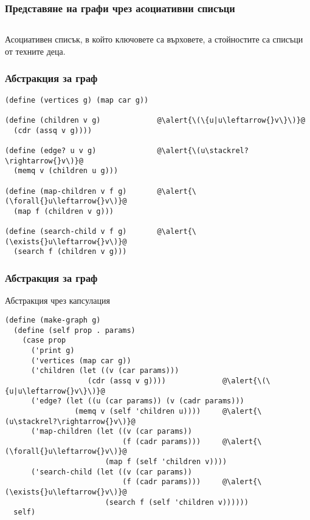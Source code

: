 \documentclass{beamer}
\begin{document}
\begin{frame}[fragile]
  \frametitle{Представяне на графи чрез асоциативни списъци}

  \begin{columns}[t,onlytextwidth]
    \begin{column}{0.7\textwidth}
      \begin{center}
        \samplegraph
      \end{center}
    \end{column}
    \begin{column}{0.3\textwidth}
\begin{semiverbatim}
 \end{semiverbatim}
    \end{column}
  \end{columns}
  \vspace{1em}
  Асоциативен списък, в който \alert{ключовете} са върховете, а \alert{стойностите} са списъци от техните деца.
\end{frame}

\begin{frame}[fragile]
  \frametitle{Абстракция за граф}

\begin{lstlisting}
(define (vertices g) (map car g))

(define (children v g)             @\alert{\(\{u|u\leftarrow{}v\}\)}@
  (cdr (assq v g))))

(define (edge? u v g)              @\alert{\(u\stackrel?\rightarrow{}v\)}@
  (memq v (children u g)))

(define (map-children v f g)       @\alert{\(\forall{}u\leftarrow{}v\)}@
  (map f (children v g)))

(define (search-child v f g)       @\alert{\(\exists{}u\leftarrow{}v\)}@
  (search f (children v g)))
\end{lstlisting}
\end{frame}

\begin{frame}[fragile]
  \frametitle{Абстракция за граф}

  Абстракция чрез капсулация
  \small
\begin{lstlisting}
(define (make-graph g)
  (define (self prop . params)
    (case prop
      ('print g)
      ('vertices (map car g))
      ('children (let ((v (car params)))
                   (cdr (assq v g))))             @\alert{\(\{u|u\leftarrow{}v\}\)}@
      ('edge? (let ((u (car params)) (v (cadr params)))
                (memq v (self 'children u))))     @\alert{\(u\stackrel?\rightarrow{}v\)}@
      ('map-children (let ((v (car params))
                           (f (cadr params)))     @\alert{\(\forall{}u\leftarrow{}v\)}@
                       (map f (self 'children v))))
      ('search-child (let ((v (car params))
                           (f (cadr params)))     @\alert{\(\exists{}u\leftarrow{}v\)}@
                       (search f (self 'children v))))))
  self)
\end{lstlisting}
\end{frame}
\end{document}
